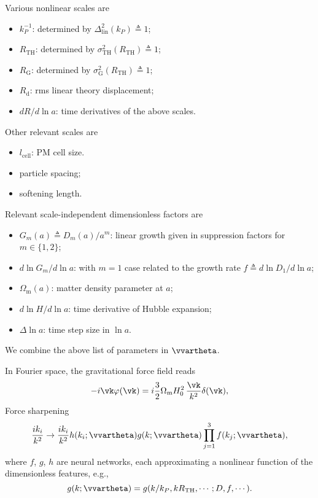 \documentclass[usenatbib]{mnras}
\renewcommand{\d}{d}
\newcommand{\Omegam}{\Omega_\mathrm{m}}
\newcommand{\linear}{\mathrm{lin}}
\newcommand{\tophat}{\mathrm{TH}}
\newcommand{\gauss}{\mathrm{G}}
\begin{document}
Various nonlinear scales are
\begin{itemize}
\item $k_P^{-1}$: determined by $\Delta_\linear^2(k_P) \triangleq 1$;
\item $R_\tophat$: determined by $\sigma_\tophat^2(R_\tophat) \triangleq
  1$;
\item $R_\gauss$: determined by $\sigma_\gauss^2(R_\tophat) \triangleq
  1$;
\item $R_\mathrm{d}$: rms linear theory displacement;
\item $\d R / \d\ln a$: time derivatives of the above scales.
\end{itemize}

Other relevant scales are
\begin{itemize}
\item $l_\mathrm{cell}$: PM cell size.
\item particle spacing;
\item softening length.
\end{itemize}

Relevant scale-independent dimensionless factors are
\begin{itemize}
\item $G_m(a) \triangleq D_m(a) / a^m$: linear growth given in
  suppression factors for $m \in \{1, 2\}$;
\item $\d\ln G_m / \d\ln a$: with $m=1$ case related to the growth rate
  $f \triangleq \d\ln D_1 / \d\ln a$;
\item $\Omegam(a)$: matter density parameter at $a$;
\item $\d\ln H / \d\ln a$: time derivative of Hubble expansion;
\item $\Delta\ln a$: time step size in $\ln a$.
\end{itemize}

We combine the above list of parameters in $\vvartheta$.


In Fourier space, the gravitational force field reads
\begin{equation}
- i \vk \varphi(\vk) = i \frac32 \Omegam H_0^2 \,\frac{\vk}{k^2} \delta(\vk),
\end{equation}
Force sharpening
%
\begin{equation}
\frac{i k_i}{k^2} \to \frac{i k_i}{k^2}
  h(k_i; \vvartheta) g(k; \vvartheta) \prod_{j=1}^3 f(k_j; \vvartheta),
\end{equation}
%
where $f$, $g$, $h$ are neural networks, each approximating a nonlinear
function of the dimensionless features, e.g.,
%
\begin{equation}
g(k; \vvartheta) = g(k/k_P, kR_\tophat, \cdots; D, f, \cdots).
\end{equation}
\end{document}

